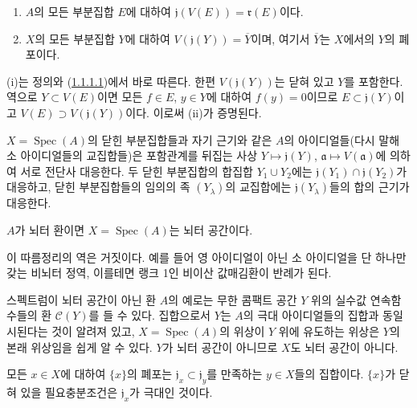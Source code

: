 \begin{proposition}[1.1.4]
\label{I.1.1.4-ko}
\begin{enumerate}
  \item[\rm(i)] $A$의 모든 부분집합 $E$에 대하여
  $\mathfrak{j}(V(E))=\mathfrak{r}(E)$이다.
  \item[\rm(ii)] $X$의 모든 부분집합 $Y$에 대하여
  $V(\mathfrak{j}(Y))=\overline{Y}$이며, 여기서
  $\overline{Y}$는 $X$에서의 $Y$의 폐포이다.
\end{enumerate}
\end{proposition}

(i)는 정의와 (\hyperref[I.1.1.1.1-ko]{1.1.1.1})에서 바로 따른다.
한편 $V(\mathfrak{j}(Y))$는 닫혀 있고 $Y$를 포함한다. 역으로
$Y\subset V(E)$이면 모든 $f\in E$, $y\in Y$에 대하여 $f(y)=0$이므로
$E\subset\mathfrak{j}(Y)$이고
$V(E)\supset V(\mathfrak{j}(Y))$이다. 이로써 (ii)가 증명된다.

\begin{corollary}[1.1.5]
\label{I.1.1.5-ko}
$X=\operatorname{Spec}(A)$의 닫힌 부분집합들과 자기 근기와 같은
$A$의 아이디얼들(다시 말해 소 아이디얼들의 교집합들)은 포함관계를
뒤집는 사상
$Y\mapsto\mathfrak{j}(Y)$, $\mathfrak{a}\mapsto V(\mathfrak{a})$에
의하여 서로 전단사 대응한다. 두 닫힌 부분집합의 합집합
$Y_1\cup Y_2$에는 $\mathfrak{j}(Y_1)\cap\mathfrak{j}(Y_2)$가
대응하고, 닫힌 부분집합들의 임의의 족 $(Y_\lambda)$의 교집합에는
$\mathfrak{j}(Y_\lambda)$들의 합의 근기가 대응한다.
\end{corollary}

\begin{corollary}[1.1.6]
\label{I.1.1.6-ko}
$A$가 뇌터 환이면 $X=\operatorname{Spec}(A)$는 뇌터 공간이다.
\end{corollary}

이 따름정리의 역은 거짓이다. 예를 들어 영 아이디얼이 아닌 소
아이디얼을 단 하나만 갖는 비뇌터 정역, 이를테면 랭크 1인 비이산
값매김환이 반례가 된다.

스펙트럼이 뇌터 공간이 아닌 환 $A$의 예로는 무한 콤팩트 공간
$Y$ 위의 실수값 연속함수들의 환 $\mathcal{C}(Y)$를 들 수 있다.
집합으로서 $Y$는 $A$의 극대 아이디얼들의 집합과 동일시된다는 것이
알려져 있고, $X=\operatorname{Spec}(A)$의 위상이 $Y$ 위에 유도하는
위상은 $Y$의 본래 위상임을 쉽게 알 수 있다. $Y$가 뇌터 공간이
아니므로 $X$도 뇌터 공간이 아니다.

\begin{corollary}[1.1.7]
\label{I.1.1.7-ko}
모든 $x\in X$에 대하여 $\{x\}$의 폐포는
$\mathfrak{j}_x\subset\mathfrak{j}_y$를 만족하는 $y\in X$들의
집합이다. $\{x\}$가 닫혀 있을 필요충분조건은
$\mathfrak{j}_x$가 극대인 것이다.
\end{corollary}

